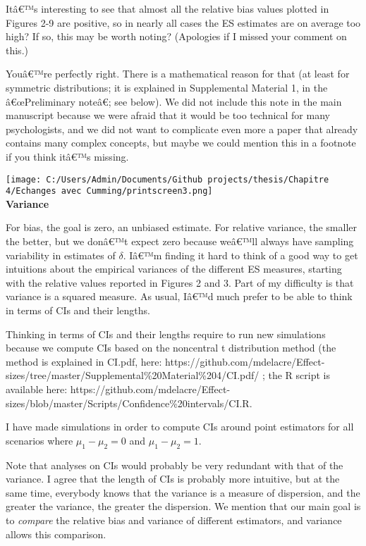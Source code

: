 \begin{appendix}
\color{black} Itâ€™s interesting to see that almost all the relative
bias values plotted in Figures 2-9 are positive, so in nearly all cases
the ES estimates are on average too high? If so, this may be worth
noting? (Apologies if I missed your comment on this.)

\color{blue} Youâ€™re perfectly right. There is a mathematical reason
for that (at least for symmetric distributions; it is explained in
Supplemental Material 1, in the â€œPreliminary noteâ€; see below). We
did not include this note in the main manuscript because we were afraid
that it would be too technical for many psychologists, and we did not
want to complicate even more a paper that already contains many complex
concepts, but maybe we could mention this in a footnote if you think
itâ€™s missing.

\texttt{[image: C:/Users/Admin/Documents/Github projects/thesis/Chapitre 4/Echanges avec Cumming/printscreen3.png]}\\
\color{black} \textbf{Variance}

For bias, the goal is zero, an unbiased estimate. For relative variance,
the smaller the better, but we donâ€™t expect zero because weâ€™ll
always have sampling variability in estimates of \(\delta\). Iâ€™m
finding it hard to think of a good way to get intuitions about the
empirical variances of the different ES measures, starting with the
relative values reported in Figures 2 and 3. Part of my difficulty is
that variance is a squared measure. As usual, Iâ€™d much prefer to be
able to think in terms of CIs and their lengths.

\color{blue} Thinking in terms of CIs and their lengths require to run
new simulations because we compute CIs based on the noncentral t
distribution method (the method is explained in CI.pdf, here:
https://github.com/mdelacre/Effect-sizes/tree/master/Supplemental\%20Material\%204/CI.pdf/
; the R script is available here:
https://github.com/mdelacre/Effect-sizes/blob/master/Scripts/Confidence\%20intervals/CI.R.

I have made simulations in order to compute CIs around point estimators
for all scenarios where \(\mu_1-\mu_2 = 0\) and \(\mu_1-\mu_2 = 1\).

Note that analyses on CIs would probably be very redundant with that of
the variance. I agree that the length of CIs is probably more intuitive,
but at the same time, everybody knows that the variance is a measure of
dispersion, and the greater the variance, the greater the dispersion. We
mention that our main goal is to \emph{compare} the relative bias and
variance of different estimators, and variance allows this comparison.


\end{appendix}
